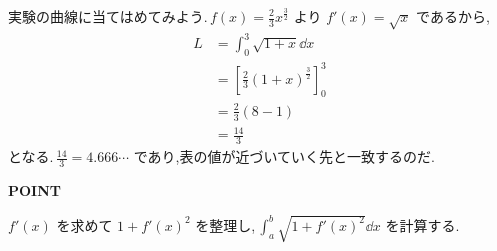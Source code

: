 実験の曲線に当てはめてみよう.\,$f(x)=\frac23x^{\frac32}$ より $f'(x)=\sqrt x$ であるから,
\begin{align*}
L&=\int_0^3\sqrt{1+x}\dd x\\
 &=\left[\frac23(1+x)^{\frac32}\right]_0^3\\
 &=\frac23(8-1)\\
 &=\frac{14}{3}
\end{align*}
となる.\,$\frac{14}{3}=4.666\cdots$ であり,表の値が近づいていく先と一致するのだ.

\begin{bookpoint}
\textbf{POINT}\par
$f'(x)$ を求めて $1+f'(x)^2$ を整理し,\,$\int_a^b\sqrt{1+f'(x)^2}\dd x$ を計算する.
\end{bookpoint}

%
